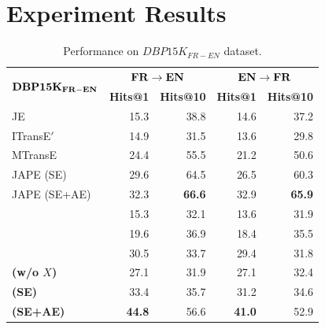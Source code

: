 \section{Experiment Results\label{sec:results}}


\begin{table}
	\centering
	\scriptsize
	\begin{tabular}{lrrrr}
		\toprule
		\multirow{2}{*}{$\bf DBP15K_{FR-EN}$} & \multicolumn{2}{c|}{$\bf FR \rightarrow EN$} & \multicolumn{2}{c}{$\bf EN \rightarrow FR$} \\
		& \bf Hits@1 & \bf Hits@10 & \bf Hits@1 & \bf Hits@10 \\
		\midrule
		\rowcolor{Gray}JE & 15.3 & 38.8 & 14.6 & 37.2 \\
		ITransE$'$ & 14.9 & 31.5 & 13.6 & 29.8 \\
		\rowcolor{Gray}MTransE & 24.4 & 55.5 & 21.2 & 50.6 \\
		JAPE (SE) & 29.6 & 64.5 & 26.5 & 60.3 \\
		\rowcolor{Gray}JAPE (SE+AE) & 32.3 & \bf 66.6 & 32.9 & \bf 65.9 \\
		\GCN & 15.3 & 32.1 & 13.6 & 31.9 \\
		\rowcolor{Gray}\HGCN & 19.6 & 36.9 & 18.4 & 35.5 \\
		\RGCN & 30.5 & 33.7 & 29.4 & 31.8 \\
		\rowcolor{Gray}\bf \HRGCN (w/o $X$) & 27.1 & 31.9 & 27.1 & 32.4 \\
		\bf \HRGCN (SE) & 33.4& 35.7& 31.2& 34.6 \\
        \rowcolor{Gray} 	\bf \HRGCN (SE+AE) & \bf 44.8 & 56.6 &\bf 41.0 & 52.9 \\
		\bottomrule
	\end{tabular}
	\caption{Performance on $DBP15K_{FR-EN}$ dataset.}
	\label{cross}
\end{table}

